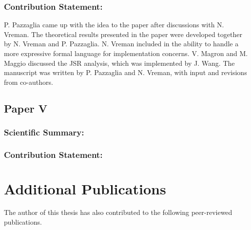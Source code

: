 \subsubsection*{Contribution Statement:}%
%
P. Pazzaglia came up with the idea to the paper after discussions with N. Vreman.
The theoretical results presented in the paper were developed together by N. Vreman and P. Pazzaglia.
N. Vreman included in \tool{} the ability to handle a more expressive formal language for implementation concerns.
V. Magron and M. Maggio discussed the JSR analysis, which was implemented by J. Wang.
The manuscript was written by P. Pazzaglia and N. Vreman, with input and revisions from co-authors.


\subsection*{Paper V}%
%
\begin{quote}
\end{quote}

\subsubsection*{Scientific Summary:}%
%
\subsubsection*{Contribution Statement:}%
%



\section{Additional Publications}%
\label{sec:additional-publications}%
%
The author of this thesis has also contributed to the following peer-reviewed publications.

\begin{quote}
\end{quote}

\begin{quote}
\end{quote}

\begin{quote}
\end{quote}

\begin{quote}
\end{quote}

\begin{quote}
\end{quote}
